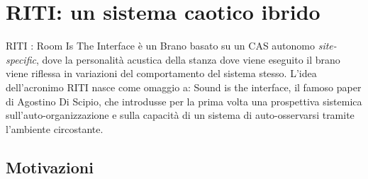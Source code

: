 \section{RITI: un sistema caotico ibrido}
\label{sec:RITI: un sistema caotico ibrido}

RITI : Room Is The Interface è un Brano basato su un CAS autonomo \textit{site-specific},
dove la personalità acustica della stanza dove viene eseguito il brano
viene riflessa in variazioni del comportamento del sistema stesso.
L'idea dell'acronimo RITI nasce come omaggio a: Sound is the interface, 
il famoso paper di Agostino Di Scipio, che introdusse per la prima volta
una prospettiva sistemica sull'auto-organizzazione e sulla capacità
di un sistema di auto-osservarsi tramite l'ambiente circostante. \\

\subsection{Motivazioni}
\label{sec:Motivazioni}

